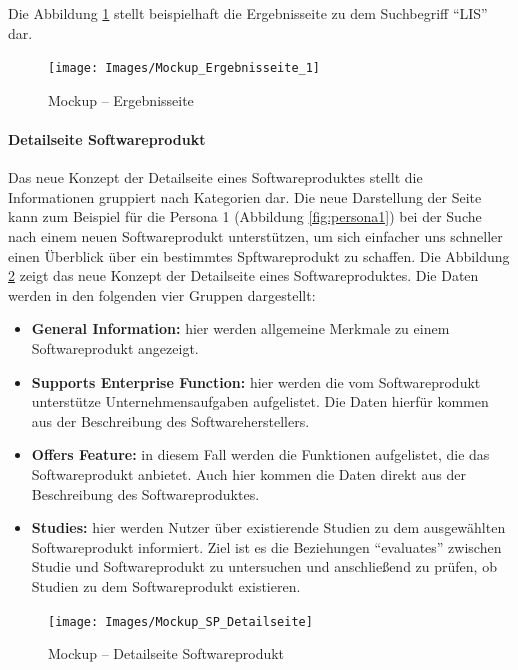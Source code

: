 Die Abbildung \ref{fig:mockup_results} stellt beispielhaft die Ergebnisseite zu dem Suchbegriff \enquote{LIS} dar.

\begin{figure}[H]
	\centering
    	\texttt{[image: Images/Mockup\_Ergebnisseite\_1]}
   	\caption[Mockup -- Ergebnisseite]{Mockup -- Ergebnisseite}
   	\label{fig:mockup_results}
\end{figure}

\clearpage

\paragraph{Detailseite Softwareprodukt}

Das neue Konzept der Detailseite eines Softwareproduktes stellt die Informationen gruppiert nach Kategorien dar.
Die neue Darstellung der Seite kann zum Beispiel für die Persona 1 (Abbildung \ref{fig:persona1}) bei der Suche nach einem neuen Softwareprodukt unterstützen, um sich einfacher uns schneller einen Überblick über ein bestimmtes Spftwareprodukt zu schaffen.
Die Abbildung \ref{fig:mockup_sp_detail} zeigt das neue Konzept der Detailseite eines Softwareproduktes.
Die Daten werden in den folgenden vier Gruppen dargestellt:

\begin{itemize}
\item \textbf{General Information:} hier werden allgemeine Merkmale zu einem Softwareprodukt angezeigt.
\item \textbf{Supports Enterprise Function:} hier werden die vom Softwareprodukt unterstütze Unternehmensaufgaben aufgelistet. Die Daten hierfür kommen aus der Beschreibung des Softwareherstellers.
\item \textbf{Offers Feature:} in diesem Fall werden die Funktionen aufgelistet, die das Softwareprodukt anbietet. Auch hier kommen die Daten direkt aus der Beschreibung des Softwareproduktes.
\item \textbf{Studies:} hier werden Nutzer über existierende Studien zu dem ausgewählten Softwareprodukt informiert. Ziel ist es die Beziehungen \enquote{evaluates} zwischen Studie und Softwareprodukt zu untersuchen und anschließend zu prüfen, ob Studien zu dem Softwareprodukt existieren.
\end{itemize}

\begin{figure}[H]
	\centering
    	\texttt{[image: Images/Mockup\_SP\_Detailseite]}
   	\caption[Mockup -- Detailseite Softwareprodukt]{Mockup -- Detailseite Softwareprodukt}
   	\label{fig:mockup_sp_detail}
\end{figure}

